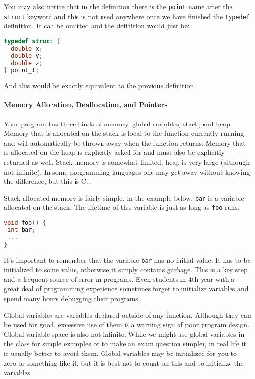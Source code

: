 You may also notice that in the definition there is the \texttt{point} name after the \texttt{struct} keyword and this is not used anywhere once we have finished the \texttt{typedef} definition. It can be omitted and the definition would just be:

\begin{lstlisting}[language=C]
typedef struct {
  double x;
  double y;
  double z;
} point_t;
\end{lstlisting}

And this would be exactly equivalent to the previous definition.

\paragraph{Memory Allocation, Deallocation, and Pointers}

Your program has three kinds of memory: global variables, stack, and heap. Memory that is allocated on the stack is local to the function currently running and will automatically be thrown away when the function returns. Memory that is allocated on the heap is explicitly asked for and must also be explicitly returned as well. Stack memory is somewhat limited; heap is very large (although not infinite). In some programming languages one may get away without knowing the difference, but this is C...

Stack allocated memory is fairly simple. In the example below, \texttt{bar} is a variable allocated on the stack. The lifetime of this variable is just as long as \texttt{foo} runs.

\begin{lstlisting}[language=C]
void foo() {
 int bar;
 ...
}
\end{lstlisting}

It's important to remember that the variable \texttt{bar} has no initial value. It has to be initialized to some value, otherwise it simply contains garbage. This is a key step and a frequent source of error in programs. Even students in 4th year with a great deal of programming experience sometimes forget to initialize variables and spend many hours debugging their programs.

Global variables are variables declared outside of any function. Although they can be used for good, excessive use of them is a warning sign of poor program design. Global variable space is also not infinite. While we might use global variables in the class for simple examples or to make an exam question simpler, in real life it is usually better to avoid them. Global variables may be initialized for you to zero or something like it, but it is best not to count on this and to initialize the variables.

